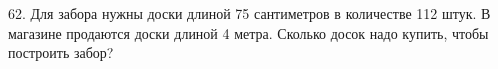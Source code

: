 62. Для забора нужны доски длиной 75 сантиметров в количестве 112 штук. В магазине продаются доски длиной 4 метра. Сколько досок надо купить, чтобы построить забор?\\
